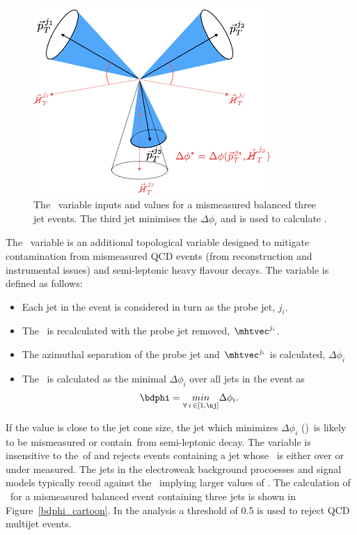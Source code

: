 \subsection{\bdphi}
\begin{figure}
\centering
    \includegraphics[width=0.8\textwidth]{./Figures/alphat/bdphi_cartoon}
  \caption{\label{fig:bdphi_cartoon} The \bdphi~variable inputs and values for a mismeasured balanced three jet events.
  The third jet minimises the $\Delta \phi_i$ and is used to calculate \bdphi.}
\end{figure}
The \bdphi~variable is an additional topological variable designed to mitigate contamination
from mismeasured QCD events (from reconstruction and instrumental issues) and semi-leptonic 
heavy flavour decays. The variable is defined as follows:
\begin{itemize}
\item Each jet in the event is considered in turn as the probe jet, $j_i$.
\item The \mhtvec~is recalculated with the probe jet removed, $\mhtvec^{j_i}$.
\item The azimuthal separation of the probe jet and $\mhtvec^{j_i}$ is calculated, $\Delta \phi_i$
\item The \bdphi~is calculated as the minimal $\Delta \phi_i$ over all jets in the event as
\begin{equation}
\label{equ:bdphi}
\bdphi = \underset{\forall\, i\, \in \left[1,\nj\right]}{min} \Delta \phi_i.
\end{equation}
\end{itemize}

If the \bdphi value is close to the jet cone size, the jet which minimizes $\Delta \phi_i$ (\jbdphi)~is likely 
to be mismeasured or contain~\met from semi-leptonic decay. The \bdphi variable is insensitive to
the~\pt of \jbdphi and rejects events containing a jet whose \pt~is either over or under measured.
The jets in the electroweak background procoesses and signal models typically recoil against the
\met~implying larger values of \bdphi. The calculation of \bdphi~for a mismeasured balanced 
event containing three jets is shown in Figure~\ref{bdphi_cartoon}.
In the \alphat analysis a threshold of 0.5 is used to reject QCD multijet events.


